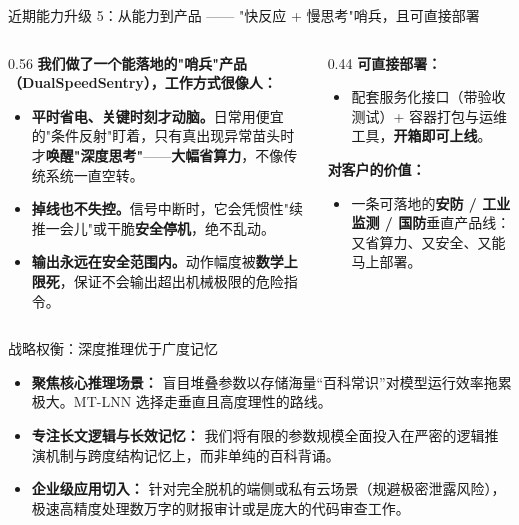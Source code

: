 ﻿\documentclass[aspectratio=169, 10pt]{beamer}
\begin{document}
\begin{frame}{近期能力升级 5：从能力到产品 —— "快反应 + 慢思考"哨兵，且可直接部署}
\small
\begin{columns}
\begin{column}{0.56\textwidth}
\textbf{我们做了一个能落地的"哨兵"产品（DualSpeedSentry），工作方式很像人：}
\begin{itemize}\itemsep=0.35em
    \item \textbf{平时省电、关键时刻才动脑。}日常用便宜的"条件反射"盯着，只有真出现异常苗头时才\textbf{唤醒"深度思考"}——\textbf{大幅省算力}，不像传统系统一直空转。
    \item \textbf{掉线也不失控。}信号中断时，它会凭惯性"续推一会儿"或干脆\textbf{安全停机}，绝不乱动。
    \item \textbf{输出永远在安全范围内。}动作幅度被\textbf{数学上限死}，保证不会输出超出机械极限的危险指令。
\end{itemize}
\end{column}
\begin{column}{0.44\textwidth}
\textbf{可直接部署：}
\begin{itemize}\itemsep=0.3em
    \item 配套服务化接口（带验收测试）+ 容器打包与运维工具，\textbf{开箱即可上线}。
\end{itemize}
\vspace{0.4em}
\textbf{对客户的价值：}
\begin{itemize}\itemsep=0.3em
    \item 一条可落地的\textbf{安防 / 工业监测 / 国防}垂直产品线：又省算力、又安全、又能马上部署。
\end{itemize}
\end{column}
\end{columns}
\end{frame}

\begin{frame}{战略权衡：深度推理优于广度记忆}
\begin{itemize}
    \item \textbf{聚焦核心推理场景：} 盲目堆叠参数以存储海量“百科常识”对模型运行效率拖累极大。MT-LNN 选择走垂直且高度理性的路线。
    \item \textbf{专注长文逻辑与长效记忆：} 我们将有限的参数规模全面投入在严密的逻辑推演机制与跨度结构记忆上，而非单纯的百科背诵。
    \item \textbf{企业级应用切入：} 针对完全脱机的端侧或私有云场景（规避极密泄露风险），极速高精度处理数万字的财报审计或是庞大的代码审查工作。
\end{itemize}
\end{frame}
\end{document}
